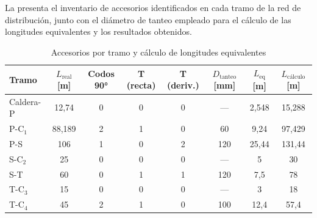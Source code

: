La  presenta el inventario de accesorios identificados en cada tramo de la red de distribución, junto con el diámetro de tanteo empleado para el cálculo de las longitudes equivalentes y los resultados obtenidos.

\begin{table}[H]
	\centering
	\caption{Accesorios por tramo y cálculo de longitudes equivalentes}
	\label{tab:accesorios-por-tramo}
	\begin{tabular}{lccccccc}
		\toprule
		\textbf{Tramo} & \textbf{$L_{\text{real}}$ [m]} & \textbf{Codos 90°} & \textbf{T (recta)} & \textbf{T (deriv.)} & \textbf{$D_{\text{tanteo}}$ [mm]} & \textbf{$L_{\text{eq}}$ [m]} & \textbf{$L_{\text{cálculo}}$ [m]} \\
		\midrule
		Caldera-P      & 12,74                          & 0                  & 0                  & 0                   & ---                               & 2,548                        & 15,288                            \\
		P-C$_1$        & 88,189                         & 2                  & 1                  & 0                   & 60                                & 9,24                         & 97,429                            \\
		P-S            & 106                            & 1                  & 0                  & 2                   & 120                               & 25,44                        & 131,44                            \\
		S-C$_2$        & 25                             & 0                  & 0                  & 0                   & ---                               & 5                            & 30                                \\
		S-T            & 60                             & 0                  & 1                  & 1                   & 120                               & 7,5                          & 78                                \\
		T-C$_3$        & 15                             & 0                  & 0                  & 0                   & ---                               & 3                            & 18                                \\
		T-C$_4$        & 45                             & 2                  & 1                  & 0                   & 100                               & 12,4                         & 57,4                              \\
		\bottomrule
	\end{tabular}
\end{table}


